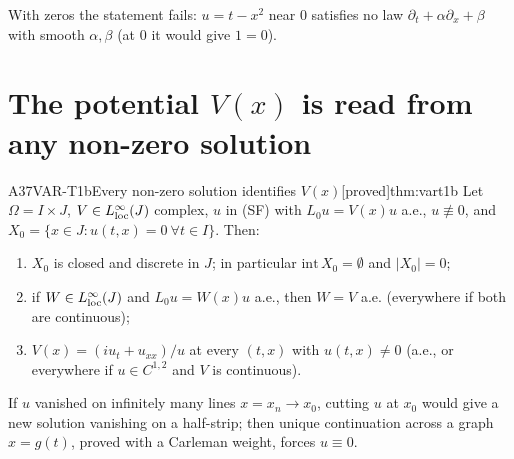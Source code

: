 \documentclass[11pt,a4paper,oneside]{report}
\newcommand{\badge}[2]{\textcolor{#1}{\textsf{\footnotesize[#2]}}}
\newcommand{\proved}{\badge{cC}{proved}}
\newenvironment{dimcard}[5]{\par\Needspace{12\baselineskip}\begin{dimcardbox}{#1}{#2}{#3}{#4}{#5}}{\end{dimcardbox}}
\begin{document}
\begin{caution}[title=The hypothesis ``no zeros'' cannot be dropped]
With zeros the statement fails: $u=t-x^2$ near $0$ satisfies no law $\partial_t+\alpha\partial_x+\beta$ with smooth $\alpha,\beta$ (at $0$ it would give $1=0$).
\end{caution}

\section{The potential $V(x)$ is read from any non-zero solution}

\begin{dimcard}{A37}{VAR-T1b}{Every non-zero solution identifies $V(x)$}{\proved}{thm:vart1b}
Let $\Omega=I\times J$, $V\in L^\infty_{\rm loc}(J)$ complex, $u$ in (SF) with $L_0u=V(x)u$ a.e., $u\not\equiv0$, and $X_0=\{x\in J:u(t,x)=0\ \forall t\in I\}$. Then:
\begin{enumerate}[label=(\roman*)]
\item $X_0$ is closed and discrete in $J$; in particular $\mathrm{int}\,X_0=\emptyset$ and $|X_0|=0$;
\item if $W\in L^\infty_{\rm loc}(J)$ and $L_0u=W(x)u$ a.e., then $W=V$ a.e. (everywhere if both are continuous);
\item $V(x)=(iu_t+u_{xx})/u$ at every $(t,x)$ with $u(t,x)\ne0$ (a.e., or everywhere if $u\in C^{1,2}$ and $V$ is continuous).
\end{enumerate}
\end{dimcard}

\begin{proofidea}
If $u$ vanished on infinitely many lines $x=x_n\to x_0$, cutting $u$ at $x_0$ would give a new solution vanishing on a half-strip; then unique continuation across a graph $x=g(t)$, proved with a Carleman weight, forces $u\equiv0$.
\end{proofidea}
\end{document}
